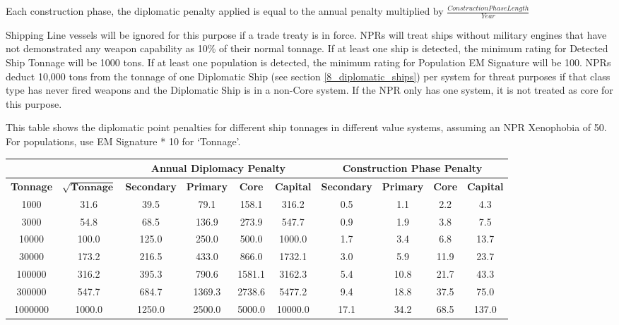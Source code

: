 \documentclass[10pt,a4paper,oneside]{article}
\begin{document}
Each construction phase, the diplomatic penalty applied is equal to the annual penalty multiplied by \( \frac{Construction Phase Length}{Year} \)

Shipping Line vessels will be ignored for this purpose if a trade treaty is in force. NPRs will treat ships without military engines that have not demonstrated any weapon capability as 10\% of their normal tonnage. If at least one ship is detected, the minimum rating for Detected Ship Tonnage will be 1000 tons. If at least one population is detected, the minimum rating for Population EM Signature will be 100. NPRs deduct 10,000 tons from the tonnage of one Diplomatic Ship (see section \ref{8_diplomatic_ships}) per system for threat purposes if that class type has never fired weapons and the Diplomatic Ship is in a non-Core system. If the NPR only has one system, it is not treated as core for this purpose.

This table shows the diplomatic point penalties for different ship tonnages in different value systems, assuming an NPR Xenophobia of 50. For populations, use EM Signature * 10 for ‘Tonnage’.
\begin{center}
	\begin{tabular}{|c|c|c|c|c|c|c|c|c|c|}
		\hline
		\multicolumn{2}{|c}{}  & \multicolumn{4}{|c|}{\textbf{Annual Diplomacy Penalty}} & \multicolumn{4}{c|}{\textbf{Construction Phase Penalty}}  \\
		\hline
		\textbf{Tonnage} & \( \sqrt{\textbf{Tonnage}} \) & \textbf{Secondary} & \textbf{Primary} & \textbf{Core} & \textbf{Capital} & \textbf{Secondary} & \textbf{Primary} & \textbf{Core} & \textbf{Capital} \\
		\hline
		1000 & 31.6 & 39.5 & 79.1 & 158.1 & 316.2 & 0.5 & 1.1 & 2.2 & 4.3 \\
		\hline
		3000 & 54.8 & 68.5 & 136.9 & 273.9 & 547.7 & 0.9 & 1.9 & 3.8 & 7.5 \\
		\hline
		10000 & 100.0 & 125.0 & 250.0 & 500.0 & 1000.0 & 1.7 & 3.4 & 6.8 & 13.7 \\
		\hline
		30000 & 173.2 & 216.5 & 433.0 & 866.0 & 1732.1 & 3.0 & 5.9 & 11.9 & 23.7 \\
		\hline
		100000 & 316.2 & 395.3 & 790.6 & 1581.1 & 3162.3 & 5.4 & 10.8 & 21.7 & 43.3 \\
		\hline
		300000 & 547.7 & 684.7 & 1369.3 & 2738.6 & 5477.2 & 9.4 & 18.8 & 37.5 & 75.0 \\
		\hline
		1000000 & 1000.0 & 1250.0 & 2500.0 & 5000.0 & 10000.0 & 17.1 & 34.2 & 68.5 & 137.0 \\
		\hline
	\end{tabular}
\end{center}
\end{document}

